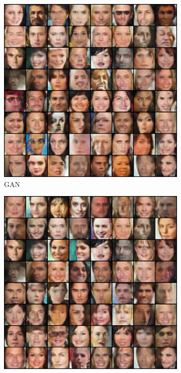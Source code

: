 \begin{figure}[htbp]
    \centering
    \begin{subfigure}[b]{0.49\textwidth}
       \centering
       \includegraphics[width=1.0\textwidth]{figures/celeba/31_base_raw_base.png}
       \caption{GAN}
    \end{subfigure}
    \begin{subfigure}[b]{0.49\textwidth}
       \centering
       \includegraphics[width=1.0\textwidth]{figures/celeba/31_base_raw_reject.png}

\end{subfigure}
\end{figure}
